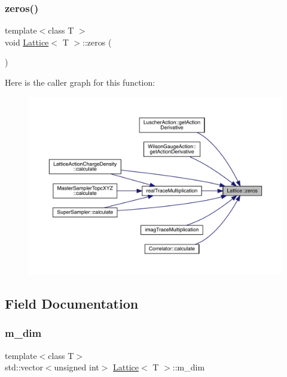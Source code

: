 \mbox{\label{class_lattice_a1e8bfb54f85e78f2c97e8b90d2b47dc9}} 
\subsubsection{\texorpdfstring{zeros()}{zeros()}}
{\footnotesize\ttfamily template$<$class T $>$ \\
void \mbox{\hyperlink{class_lattice}{Lattice}}$<$ T $>$\+::zeros (\begin{DoxyParamCaption}{ }\end{DoxyParamCaption})\hspace{0.3cm}{\ttfamily [inline]}}

Here is the caller graph for this function\+:\nopagebreak
\begin{figure}[H]
\begin{center}
\leavevmode
\includegraphics[width=350pt]{class_lattice_a1e8bfb54f85e78f2c97e8b90d2b47dc9_icgraph}
\end{center}
\end{figure}


\subsection{Field Documentation}
\mbox{\label{class_lattice_a6adf73dcd2ef1663d7d38b192f7fd91e}} 
\subsubsection{\texorpdfstring{m\_dim}{m\_dim}}
{\footnotesize\ttfamily template$<$class T$>$ \\
std\+::vector$<$unsigned int$>$ \mbox{\hyperlink{class_lattice}{Lattice}}$<$ T $>$\+::m\+\_\+dim}

